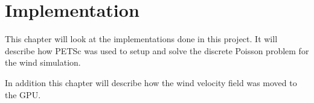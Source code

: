 \chapter{Implementation}

This chapter will look at the implementations done in this project. It will describe 
how PETSc was used to setup and solve the discrete Poisson problem for the wind 
simulation. 

In addition this chapter will describe how the wind velocity field was moved to 
the GPU.





